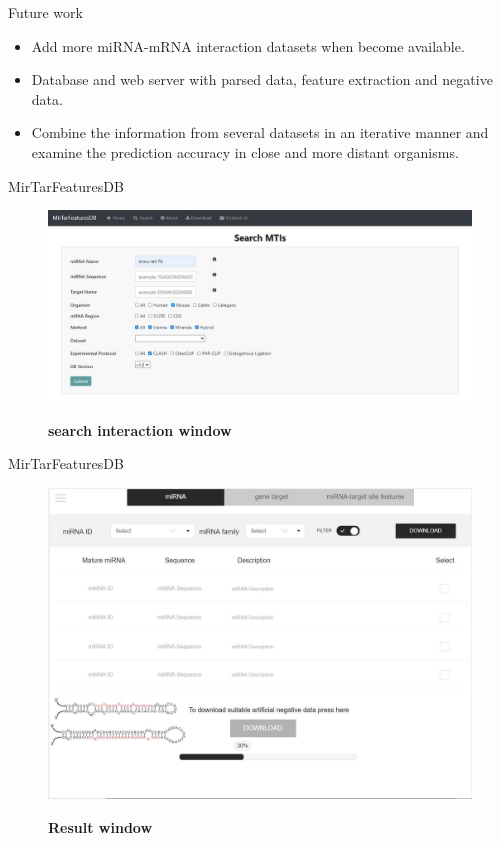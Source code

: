 \documentclass{beamer}
\begin{document}
\begin{frame}{Future work}
\begin{itemize}
\item Add more miRNA-mRNA interaction datasets when become available.
\item Database and web server with parsed data, feature extraction and negative data.
\item Combine the information from several datasets in an iterative manner and examine the prediction accuracy in close and more distant organisms.
\end{itemize}
\end{frame}


\begin{frame}{MirTarFeaturesDB}


\begin{figure}[h!]
  \caption{\textbf{search interaction window}}
      \includegraphics[width = 1\textwidth]{db figures/search interaction window.jpg}
      \label{fig:search}
          \end{figure}
\end{frame}
\begin{frame}{MirTarFeaturesDB}


\begin{figure}[h!]
  \caption{\textbf{Result window}}
      \includegraphics[width = 1\textwidth]{db figures/result.jpg}
      \label{fig:dbresult}
          \end{figure}
\end{frame}
\end{document}
